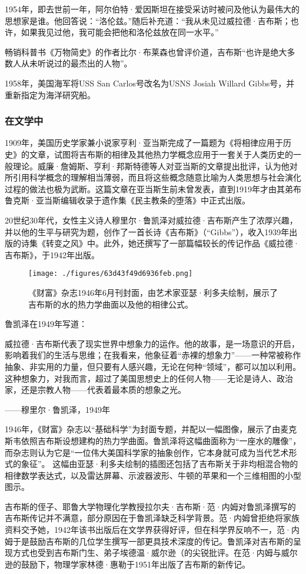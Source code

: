 1954年，即去世前一年，阿尔伯特·爱因斯坦在接受采访时被问及他认为最伟大的思想家是谁。他回答说：“洛伦兹。”随后补充道：“我从未见过威拉德·吉布斯；也许，如果我见过他，我可能会把他和洛伦兹放在同一水平。”

畅销科普书《万物简史》的作者比尔·布莱森也曾评价道，吉布斯“也许是绝大多数人从未听说过的最杰出的人物”。

1958年，美国海军将USS San Carlos号改名为USNS Josiah Willard Gibbs号，并重新指定为海洋研究船。
\subsubsection{在文学中}
1909年，美国历史学家兼小说家亨利·亚当斯完成了一篇题为《将相律应用于历史》的文章，试图将吉布斯的相律及其他热力学概念应用于一套关于人类历史的一般理论。威廉·詹姆斯、亨利·邦斯特德等人对亚当斯的文章提出批评，认为他对所引用科学概念的理解相当薄弱，而且将这些概念随意比喻为人类思想与社会演化过程的做法也极为武断。这篇文章在亚当斯生前未曾发表，直到1919年才由其弟布鲁克斯·亚当斯编辑收录于遗作集《民主教条的堕落》中正式出版。

20世纪30年代，女性主义诗人穆里尔·鲁凯泽对威拉德·吉布斯产生了浓厚兴趣，并以他的生平与研究为题，创作了一首长诗《吉布斯》（“Gibbs”），收入1939年出版的诗集《转变之风》中。此外，她还撰写了一部篇幅较长的传记作品《威拉德·吉布斯》，于1942年出版。
\begin{figure}[ht]
\centering
\texttt{[image: ./figures/63d43f49d6936feb.png]}
\caption{《财富》杂志1946年6月刊封面，由艺术家亚瑟·利多夫绘制，展示了吉布斯的水的热力学曲面以及他的相律公式。} \label{fig_QSY_15}
\end{figure}
鲁凯泽在1949年写道：

威拉德·吉布斯代表了现实世界中想象力的运作。他的故事，是一场意识的开启，影响着我们的生活与思维；在我看来，他象征着“赤裸的想象力”——一种常被称作抽象、非实用的力量，但只要有人感兴趣，无论在何种“领域”，都可以加以利用。这种想象力，对我而言，超过了美国思想史上的任何人物——无论是诗人、政治家，还是宗教人物——代表着最本质的想象之光。

——穆里尔·鲁凯泽，1949年

1946年，《财富》杂志以“基础科学”为封面专题，并配以一幅图像，展示了由麦克斯韦依照吉布斯设想建构的热力学曲面。鲁凯泽将这幅曲面称为“一座水的雕像”，而杂志则认为它是“一位伟大美国科学家的抽象创作，它本身就可成为当代艺术形式的象征”。
这幅由亚瑟·利多夫绘制的插图还包括了吉布斯关于非均相混合物的相律数学表达式，以及雷达屏幕、示波器波形、牛顿的苹果和一个三维相图的小型图示。

吉布斯的侄子、耶鲁大学物理化学教授拉尔夫·吉布斯·范·内姆对鲁凯泽撰写的吉布斯传记并不满意，部分原因在于鲁凯泽缺乏科学背景。范·内姆曾拒绝将家族资料交予她，1942年该书出版后在文学界获得好评，但在科学界反响不一，范·内姆于是鼓励吉布斯的几位学生撰写一部更具技术深度的传记。鲁凯泽对吉布斯的呈现方式也受到吉布斯门生、弟子埃德温·威尔逊（的尖锐批评。在范·内姆与威尔逊的鼓励下，物理学家林德·惠勒于1951年出版了吉布斯的新传记。

